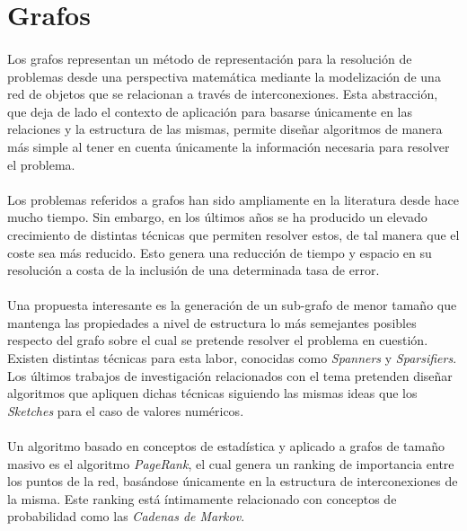 \documentclass{subfiles}
\begin{document}
    \section{Grafos}
    \label{sec:introduction_graphs}

      \paragraph{}
      Los grafos representan un método de representación para la resolución de problemas desde una perspectiva matemática mediante la modelización de una red de objetos que se relacionan a través de interconexiones. Esta abstracción, que deja de lado el contexto de aplicación para basarse únicamente en las relaciones y la estructura de las mismas, permite diseñar algoritmos de manera más simple al tener en cuenta únicamente la información necesaria para resolver el problema.

      \paragraph{}
      Los problemas referidos a grafos han sido ampliamente en la literatura desde hace mucho tiempo. Sin embargo, en los últimos años se ha producido un elevado crecimiento de distintas técnicas que permiten resolver estos, de tal manera que el coste sea más reducido. Esto genera una reducción de tiempo y espacio en su resolución a costa de la inclusión de una determinada tasa de error.

      \paragraph{}
      Una propuesta interesante es la generación de un sub-grafo de menor tamaño que mantenga las propiedades a nivel de estructura lo más semejantes posibles respecto del grafo sobre el cual se pretende resolver el problema en cuestión. Existen distintas técnicas para esta labor, conocidas como \emph{Spanners} y \emph{Sparsifiers}. Los últimos trabajos de investigación relacionados con el tema pretenden diseñar algoritmos que apliquen dichas técnicas siguiendo las mismas ideas que los \emph{Sketches} para el caso de valores numéricos.

      \paragraph{}
      Un algoritmo basado en conceptos de estadística y aplicado a grafos de tamaño masivo es el algoritmo \emph{PageRank}, el cual genera un ranking de importancia entre los puntos de la red, basándose únicamente en la estructura de interconexiones de la misma. Este ranking está íntimamente relacionado con conceptos de probabilidad como las \emph{Cadenas de Markov}.
\end{document}
